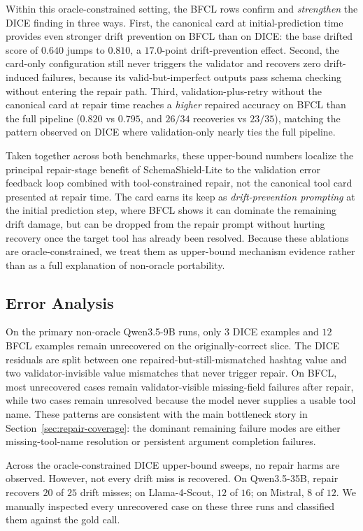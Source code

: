 \documentclass{llncs}
\newcommand{\method}{SchemaShield-Lite\xspace}
\begin{document}
Within this oracle-constrained setting, the BFCL rows confirm and \emph{strengthen}
the DICE finding in three ways.
First, the canonical card at initial-prediction time provides even stronger
drift prevention on BFCL than on DICE: the base drifted score of $0.640$ jumps
to $0.810$, a $17.0$-point drift-prevention effect. Second, the card-only
configuration still never triggers the validator and recovers zero
drift-induced failures, because its valid-but-imperfect outputs pass schema
checking without entering the repair path. Third, validation-plus-retry
without the canonical card at repair time reaches a \emph{higher} repaired
accuracy on BFCL than the full pipeline ($0.820$ vs $0.795$, and $26/34$
recoveries vs $23/35$), matching the pattern observed on DICE where
validation-only nearly ties the full pipeline.

Taken together across both benchmarks, these upper-bound numbers localize the
principal repair-stage benefit of \method to the validation error feedback loop
combined with tool-constrained repair, not the canonical tool card presented at
repair time. The card earns its keep as \emph{drift-prevention prompting}
at the initial prediction step, where BFCL shows it can dominate the
remaining drift damage, but can be dropped from the repair prompt without
hurting recovery once the target tool has already been resolved. Because these
ablations are oracle-constrained, we treat them as upper-bound mechanism evidence
rather than as a full explanation of non-oracle portability.

\subsection{Error Analysis}
\label{sec:error-analysis}
On the primary non-oracle Qwen3.5-9B runs, only $3$ DICE examples and $12$ BFCL
examples remain unrecovered on the originally-correct slice. The DICE residuals are
split between one repaired-but-still-mismatched hashtag value and two
validator-invisible value mismatches that never trigger repair. On BFCL, most
unrecovered cases remain validator-visible missing-field failures after repair,
while two cases remain unresolved because the model never supplies a usable tool
name. These patterns are consistent with the main bottleneck story in
Section~\ref{sec:repair-coverage}: the dominant remaining failure modes are either
missing-tool-name resolution or persistent argument completion failures.

Across the oracle-constrained DICE upper-bound sweeps, no repair harms are observed.
However, not every drift miss is recovered. On Qwen3.5-35B, repair recovers $20$ of
$25$ drift misses; on Llama-4-Scout, $12$ of $16$; on Mistral, $8$ of $12$. We
manually inspected every unrecovered case on these three runs and classified them
against the gold call.
\end{document}
